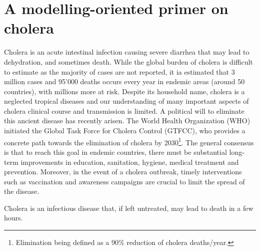 \chapter{A modelling-oriented primer on cholera}
Cholera is an acute intestinal infection causing severe diarrhea that may lead to dehydration, and sometimes death. While the global burden of cholera is difficult to estimate as the majority of cases are not reported, it ia estimated that 3 million cases and 95'000 deaths occurs every year in endemic areas (around 50 countries)\cite{Ali:UpdatedGlobalBurden:2015}, with millions more at risk. Despite its household name, cholera is a neglected tropical diseases and our understanding of many important aspects of cholera clinical course and transmission is limited.
A political will to eliminate this ancient disease has recently arisen. The World Health Organization (WHO) initiated the Global Task Force for Cholera Control (GTFCC), who provides a concrete path towards the elimination of cholera by 2030\footnote{Elimination being defined as a 90\% reduction of cholera deaths/year.}. The general consensus is that to reach this goal in endemic countries, there must be substantial long-term improvements in education, sanitation, hygiene, medical treatment and prevention.  Moreover, in the event of a cholera outbreak, timely interventions such as vaccination and awareness campaigns are crucial to limit the spread of the disease. %


Cholera is an infectious disease that, if left untreated, may lead to death in a few hours. 
